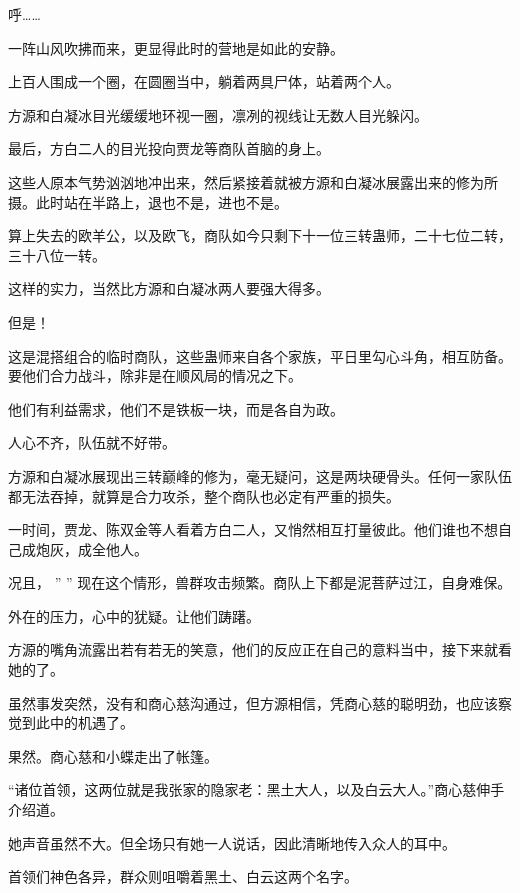
\begin{this_body}



呼……

一阵山风吹拂而来，更显得此时的营地是如此的安静。

上百人围成一个圈，在圆圈当中，躺着两具尸体，站着两个人。

方源和白凝冰目光缓缓地环视一圈，凛冽的视线让无数人目光躲闪。

最后，方白二人的目光投向贾龙等商队首脑的身上。

这些人原本气势汹汹地冲出来，然后紧接着就被方源和白凝冰展露出来的修为所摄。此时站在半路上，退也不是，进也不是。

算上失去的欧羊公，以及欧飞，商队如今只剩下十一位三转蛊师，二十七位二转，三十八位一转。

这样的实力，当然比方源和白凝冰两人要强大得多。

但是！

这是混搭组合的临时商队，这些蛊师来自各个家族，平日里勾心斗角，相互防备。要他们合力战斗，除非是在顺风局的情况之下。

他们有利益需求，他们不是铁板一块，而是各自为政。

人心不齐，队伍就不好带。

方源和白凝冰展现出三转巅峰的修为，毫无疑问，这是两块硬骨头。任何一家队伍都无法吞掉，就算是合力攻杀，整个商队也必定有严重的损失。

一时间，贾龙、陈双金等人看着方白二人，又悄然相互打量彼此。他们谁也不想自己成炮灰，成全他人。

况且， ” ” 现在这个情形，兽群攻击频繁。商队上下都是泥菩萨过江，自身难保。

外在的压力，心中的犹疑。让他们踌躇。

方源的嘴角流露出若有若无的笑意，他们的反应正在自己的意料当中，接下来就看她的了。

虽然事发突然，没有和商心慈沟通过，但方源相信，凭商心慈的聪明劲，也应该察觉到此中的机遇了。

果然。商心慈和小蝶走出了帐篷。

“诸位首领，这两位就是我张家的隐家老：黑土大人，以及白云大人。”商心慈伸手介绍道。

她声音虽然不大。但全场只有她一人说话，因此清晰地传入众人的耳中。

首领们神色各异，群众则咀嚼着黑土、白云这两个名字。


\end{this_body}
